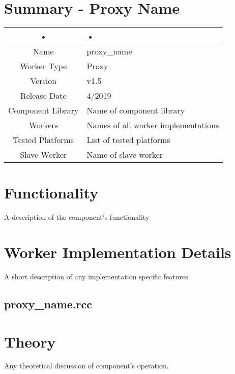 \documentclass{article}
\author{} %
\date{Version \docVersion} %
\title{\docTitle}
\def\docVersion{1.5}
\def\comp{proxy\_name}
\def\Comp{Proxy Name}
\begin{document}
\section*{Summary - \Comp}
\begin{tabular}{|c|M{13.5cm}|}
	\hline
	•               & •                                 \\
	\hline
	Name              & \comp                               \\
	\hline
	Worker Type       & Proxy                               \\
	\hline
	Version           & v\docVersion                               \\
	\hline
	Release Date      & 4/2019                        \\
	\hline
	Component Library & Name of component library           \\
	\hline
	Workers           & Names of all worker implementations \\
	\hline
	Tested Platforms  & List of tested platforms            \\
	\hline
	Slave Worker      & Name of slave worker                \\
	\hline
\end{tabular}

\section*{Functionality}
\begin{flushleft}
	A description of the component's functionality
\end{flushleft}

\section*{Worker Implementation Details}
\begin{flushleft}
	A short description of any implementation specific features
	\subsection*{\comp.rcc}
\end{flushleft}

\section*{Theory}
\begin{flushleft}
	Any theoretical discussion of component's operation.
\end{flushleft}
\end{document}
